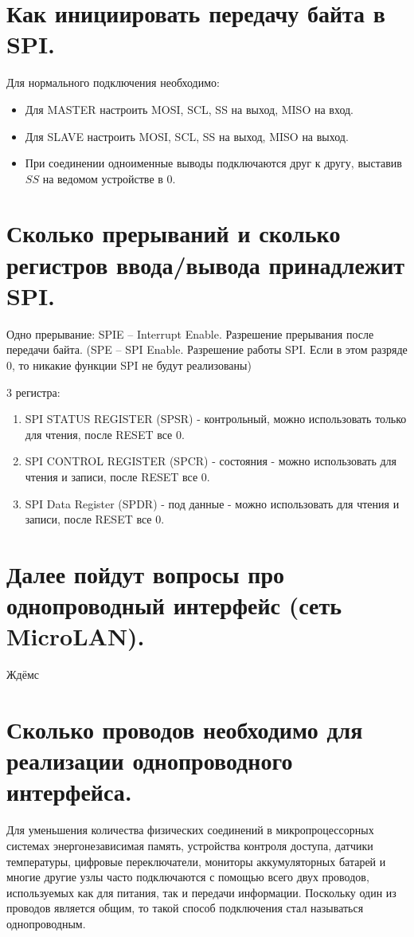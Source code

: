 \section{Как инициировать передачу байта в SPI.}

Для нормального подключения необходимо:
\begin{itemize}
  \item Для MASTER настроить MOSI, SCL, SS на выход, MISO на вход.
  \item Для SLAVE настроить MOSI, SCL, SS на выход, MISO на выход.
  \item При соединении одноименные выводы подключаются друг к другу, выставив $SS$ на ведомом 
        устройстве в $0$. 
\end{itemize}

\section{Сколько прерываний и сколько регистров ввода/вывода принадлежит SPI.}

Одно прерывание: SPIE – Interrupt Enable. Разрешение прерывания после передачи байта. 
(SPE – SPI Enable. Разрешение работы SPI. Если в этом разряде $0$, то никакие функции SPI 
не будут реализованы)

3 регистра: 
\begin{enumerate}
  \item SPI STATUS REGISTER (SPSR) - контрольный, можно использовать только для чтения,
        после RESET все $0$. 
  \item SPI CONTROL REGISTER (SPCR) - состояния - можно использовать для чтения и записи,
        после RESET все $0$.
  \item SPI Data Register (SPDR) - под данные - можно использовать для чтения и записи,
        после RESET все $0$. 
\end{enumerate}

\section{Далее пойдут вопросы про однопроводный интерфейс (сеть MicroLAN).}

Ждёмс

\section{Сколько проводов необходимо для реализации однопроводного интерфейса.}

Для уменьшения количества физических соединений в микропроцессорных системах энергонезависимая
память, устройства контроля доступа, датчики температуры, цифровые переключатели, мониторы
аккумуляторных батарей и многие другие узлы часто подключаются с помощью всего двух проводов,
используемых как для питания, так и передачи информации. Поскольку один из проводов является
общим, то такой способ подключения стал называться однопроводным.

